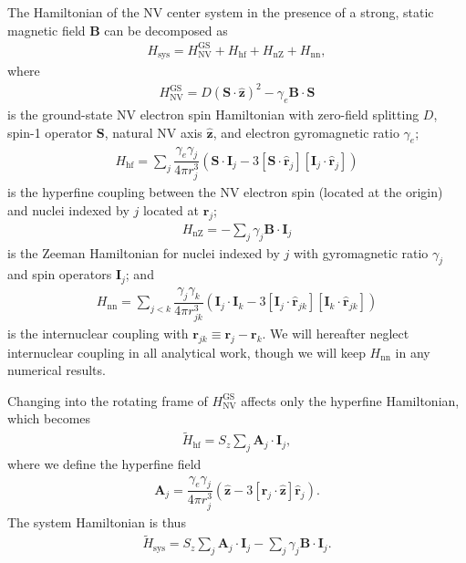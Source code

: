 \documentclass[twocolumn]{revtex4-1}
\renewcommand{\t}{\text} %
\newcommand{\f}[2]{\dfrac{#1}{#2}} %
\newcommand{\p}[1]{\left(#1\right)} %
\renewcommand{\sp}[1]{\left[#1\right]} %
\renewcommand{\v}{\bm} %
\newcommand{\uv}[1]{\hat{\v{#1}}} %
\renewcommand{\c}{\cdot} %
\newcommand{\NV}{\t{NV}}
\begin{document}
The Hamiltonian of the NV center system in the presence of a strong,
static magnetic field $\v B$ can be decomposed as
\begin{align}
  H_{\t{sys}} = H_\NV^{\t{GS}} + H_{\t{hf}} + H_{\t{nZ}}  + H_{\t{nn}},
\end{align}
where
\begin{align}
  H_\NV^{\t{GS}} = D\p{\v S\c\uv z}^2 - \gamma_e\v B\c\v S
\end{align}
is the ground-state NV electron spin Hamiltonian with zero-field
splitting $D$, spin-1 operator $\v S$, natural NV axis $\uv z$, and
electron gyromagnetic ratio $\gamma_e$;
\begin{align}
  H_{\t{hf}} = \sum_j\f{\gamma_e\gamma_j}{4\pi r_j^3}
  \p{\v S\c\v I_j-3\sp{\v S\c\uv r_j}\sp{\v I_j\c\uv r_j}}
\end{align}
is the hyperfine coupling between the NV electron spin (located at the
origin) and nuclei indexed by $j$ located at $\v r_j$;
\begin{align}
  H_{\t{nZ}} = -\sum_j\gamma_j\v B\c\v I_j
\end{align}
is the Zeeman Hamiltonian for nuclei indexed by $j$ with gyromagnetic
ratio $\gamma_j$ and spin operators $\v I_j$; and
\begin{align}
  H_{\t{nn}} = \sum_{j<k}\f{\gamma_j\gamma_k}{4\pi r_{jk}^3}
  \p{\v I_j\c\v I_k-3\sp{\v I_j\c\uv r_{jk}}\sp{\v I_k\c\uv r_{jk}}}
\end{align}
is the internuclear coupling with $\v r_{jk}\equiv\v r_j-\v r_k$. We
will hereafter neglect internuclear coupling in all analytical work,
though we will keep $H_{\t{nn}}$ in any numerical results.

Changing into the rotating frame of $H_\NV^{\t{GS}}$ affects only the
hyperfine Hamiltonian, which becomes
\begin{align}
  \tilde H_{\t{hf}} = S_z\sum_j \v A_j\c\v I_j,
\end{align}
where we define the hyperfine field
\begin{align}
  \v A_j = \f{\gamma_e\gamma_j}{4\pi r_j^3}\p{\uv z - 3\sp{\uv
  r_j\c\uv z}\uv r_j}.
\end{align}
The system Hamiltonian is thus
\begin{align}
  \tilde H_{\t{sys}} = S_z\sum_j \v A_j\c\v I_j
  -\sum_j\gamma_j\v B\c\v I_j.
\end{align}
\end{document}
